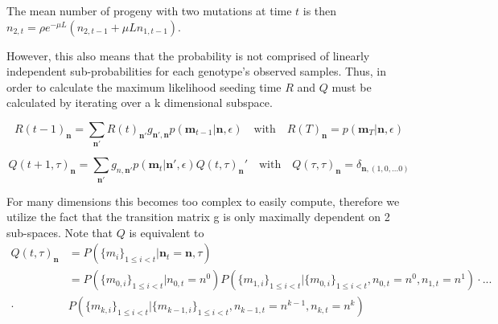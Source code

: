 \documentclass[aps,rmp, onecolumn]{revtex4}
\begin{document}
The mean number of progeny with two mutations  at time $t$ is then $n_{2,t} = \rho e^{-\mu L} (n_{2,t-1} + \mu L n_{1, t-1})$.

However, this also means that the probability is not comprised of linearly independent sub-probabilities for each genotype's observed samples. Thus, in order to calculate the maximum likelihood seeding time $R$ and $Q$ must be calculated by iterating over a k dimensional subspace. 

\begin{equation}
    R(t-1)_{\textbf{n}} = \sum_{\textbf{n}'} R(t)_{\textbf{n}'} g_{\textbf{n}',\textbf{n}} p(\textbf{m}_{t-1}|\textbf{n},\epsilon) \quad \mathrm{with} \quad R(T)_\textbf{n} = p(\textbf{m}_{T}|\textbf{n},\epsilon)
\end{equation}

\begin{equation}
    Q(t+1,\tau)_{\textbf{n}} = \sum_{\textbf{n}'} g_{n,\textbf{n}'} p(\textbf{m}_t|\textbf{n}',\epsilon) Q(t,\tau)_{\textbf{n}}'  \quad \mathrm{with} \quad Q(\tau,\tau)_{\textbf{n}} = \delta_{{\textbf{n}},(1,0,... 0)}
\end{equation}

For many dimensions this becomes too complex to easily compute, therefore we utilize the fact that the transition matrix g is only maximally dependent on 2 sub-spaces. Note that $Q$ is equivalent to 
\begin{equation}
\begin{split}
    Q(t,\tau)_{\textbf{n}} &= P(\{m_i\}_{1 \leq i<t} | \textbf{n}_t = \textbf{n}, \tau) \\
    & = P(\{m_{0,i}\}_{1 \leq i<t} | n_{0,t} = n^0) P(\{m_{1,i}\}_{1 \leq i<t} | \{m_{0,i}\}_{1 \leq i<t}, n_{0,t} = n^0, n_{1,t} = n^1) \cdot ...\\ \cdot & P(\{m_{k,i}\}_{1 \leq i<t} | \{m_{k-1,i}\}_{1 \leq i<t}, n_{k-1, t} = n^{k-1}, n_{k,t} = n^k)
    \end{split}
\end{equation}
\end{document}
